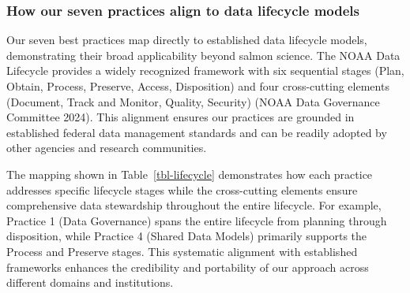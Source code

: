 \documentclass[
  letterpaper,
  DIV=11,
  numbers=noendperiod]{scrartcl}
\begin{document}
\subsubsection{How our seven practices align to data lifecycle
models}\label{how-our-seven-practices-align-to-data-lifecycle-models}

Our seven best practices map directly to established data lifecycle
models, demonstrating their broad applicability beyond salmon science.
The NOAA Data Lifecycle provides a widely recognized framework with six
sequential stages (Plan, Obtain, Process, Preserve, Access, Disposition)
and four cross-cutting elements (Document, Track and Monitor, Quality,
Security) (NOAA Data Governance Committee 2024). This alignment ensures
our practices are grounded in established federal data management
standards and can be readily adopted by other agencies and research
communities.

The mapping shown in Table~\ref{tbl-lifecycle} demonstrates how each
practice addresses specific lifecycle stages while the cross-cutting
elements ensure comprehensive data stewardship throughout the entire
lifecycle. For example, Practice 1 (Data Governance) spans the entire
lifecycle from planning through disposition, while Practice 4 (Shared
Data Models) primarily supports the Process and Preserve stages. This
systematic alignment with established frameworks enhances the
credibility and portability of our approach across different domains and
institutions.
\end{document}
